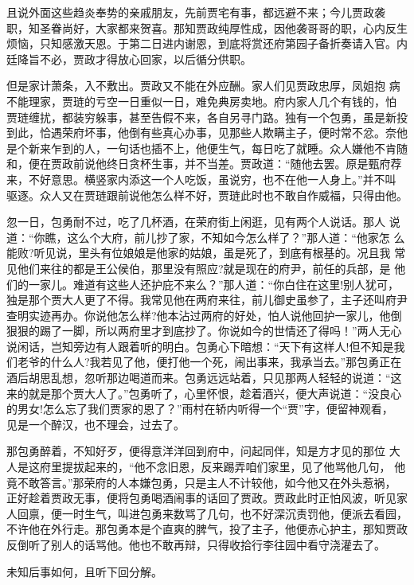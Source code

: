 且说外面这些趋炎奉势的亲戚朋友，先前贾宅有事，都远避不来；今儿贾政袭
职，知圣眷尚好，大家都来贺喜。那知贾政纯厚性成，因他袭哥哥的职，心内反生
烦恼，只知感激天恩。于第二日进内谢恩，到底将赏还府第园子备折奏请入官。内
廷降旨不必，贾政才得放心回家，以后循分供职。

但是家计萧条，入不敷出。贾政又不能在外应酬。家人们见贾政忠厚，凤姐抱
病不能理家，贾琏的亏空一日重似一日，难免典房卖地。府内家人几个有钱的，怕
贾琏缠扰，都装穷躲事，甚至告假不来，各自另寻门路。独有一个包勇，虽是新投
到此，恰遇荣府坏事，他倒有些真心办事，见那些人欺瞒主子，便时常不忿。奈他
是个新来乍到的人，一句话也插不上，他便生气，每日吃了就睡。众人嫌他不肯随
和，便在贾政前说他终日贪杯生事，并不当差。贾政道：“随他去罢。原是甄府荐
来，不好意思。横竖家内添这一个人吃饭，虽说穷，也不在他一人身上。”并不叫
驱逐。众人又在贾琏跟前说他怎么样不好，贾琏此时也不敢自作威福，只得由他。

忽一日，包勇耐不过，吃了几杯酒，在荣府街上闲逛，见有两个人说话。那人
说道：“你瞧，这么个大府，前儿抄了家，不知如今怎么样了？”那人道：“他家怎
么能败?听见说，里头有位娘娘是他家的姑娘，虽是死了，到底有根基的。况且我
常见他们来往的都是王公侯伯，那里没有照应?就是现在的府尹，前任的兵部，是
他们的一家儿。难道有这些人还护庇不来么？”那人道：“你白住在这里!别人犹可，
独是那个贾大人更了不得。我常见他在两府来往，前儿御史虽参了，主子还叫府尹
查明实迹再办。你说他怎么样?他本沾过两府的好处，怕人说他回护一家儿，他倒
狠狠的踢了一脚，所以两府里才到底抄了。你说如今的世情还了得吗！”两人无心
说闲话，岂知旁边有人跟着听的明白。包勇心下暗想：“天下有这样人!但不知是我
们老爷的什么人?我若见了他，便打他一个死，闹出事来，我承当去。”那包勇正在
酒后胡思乱想，忽听那边喝道而来。包勇远远站着，只见那两人轻轻的说道：“这
来的就是那个贾大人了。”包勇听了，心里怀恨，趁着酒兴，便大声说道：“没良心
的男女!怎么忘了我们贾家的恩了？”雨村在轿内听得一个“贾”字，便留神观看，
见是一个醉汉，也不理会，过去了。

那包勇醉着，不知好歹，便得意洋洋回到府中，问起同伴，知是方才见的那位
大人是这府里提拔起来的，“他不念旧恩，反来踢弄咱们家里，见了他骂他几句，
他竟不敢答言。”那荣府的人本嫌包勇，只是主人不计较他，如今他又在外头惹祸，
正好趁着贾政无事，便将包勇喝酒闹事的话回了贾政。贾政此时正怕风波，听见家
人回禀，便一时生气，叫进包勇来数骂了几句，也不好深沉责罚他，便派去看园，
不许他在外行走。那包勇本是个直爽的脾气，投了主子，他便赤心护主，那知贾政
反倒听了别人的话骂他。他也不敢再辩，只得收拾行李往园中看守浇灌去了。

未知后事如何，且听下回分解。